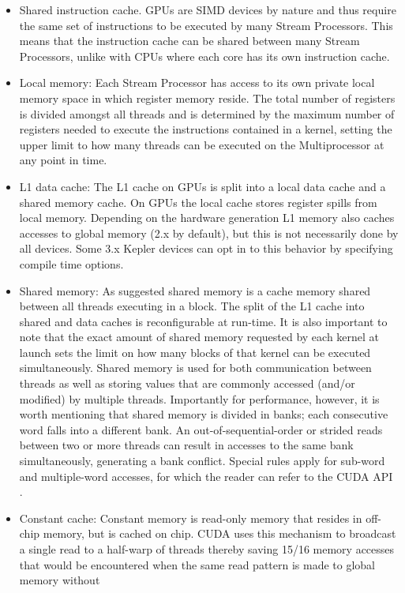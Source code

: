 \begin{itemize}
 \item Shared instruction cache. GPUs are SIMD devices by nature and thus require the same set of instructions to be executed
 by many Stream Processors. This means that the instruction cache can be shared between many Stream Processors, unlike with CPUs
 where each core has its own instruction cache.
 \item Local memory: Each Stream Processor has access to its own private local memory space in which register memory reside. The total number of
 registers is divided amongst all threads and is determined by the maximum number of registers needed to execute the instructions contained in a 
 kernel, setting the upper limit to how many threads can be executed on the Multiprocessor at any point in time. 
 \item L1 data cache: The L1 cache on GPUs is split into a local data cache and a shared memory cache. On GPUs the local cache stores register 
 spills from local memory. Depending on the hardware generation L1 memory also caches accesses to global memory (2.x by default), but this is
 not necessarily done by all devices. Some 3.x Kepler devices can opt in to this behavior by specifying compile time options.
 \item Shared memory: As suggested shared memory is a cache memory shared between all threads executing in a block. The split of the L1 cache into
 shared and data caches is reconfigurable at run-time. It is also important to note that the exact amount of shared memory requested by each kernel at 
 launch sets the limit on how many blocks of that kernel can be executed simultaneously. Shared memory is used for both communication between threads as well
 as storing values that are commonly accessed (and/or modified) by multiple threads. Importantly for performance, however, it is worth mentioning that
 shared memory is divided in banks; each consecutive word falls into a different bank. An out-of-sequential-order or strided reads between two or more threads
 can result in accesses to the same bank simultaneously, generating a bank conflict. Special rules apply for sub-word and multiple-word accesses, for
 which the reader can refer to the CUDA API \cite[Section G: Compute Capabilities]{cuda}.
 \item Constant cache: Constant memory is read-only memory that resides in off-chip memory, but is cached on chip. CUDA uses this mechanism to broadcast
 a single read to a half-warp of threads thereby saving 15/16 memory accesses that would be encountered when the same read pattern is made to global memory without 

\end{itemize}
